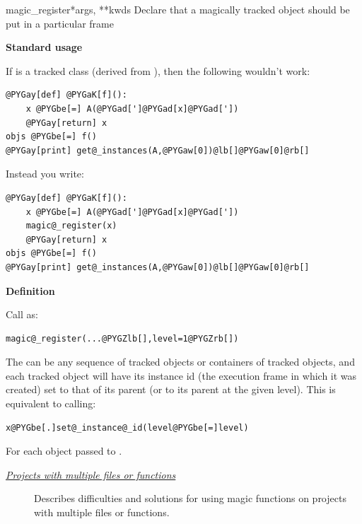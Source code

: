 \documentclass[letterpaper,10pt,english]{manual}
\begin{document}
\hypertarget{brian.magic_register}{}\begin{funcdesc}{magic\_register}{*args, **kwds}
Declare that a magically tracked object should be put in a particular frame

\textbf{Standard usage}

If  is a tracked class (derived from ), then the following wouldn't
work:

\begin{Verbatim}[commandchars=@\[\]]
@PYGay[def] @PYGaK[f]():
    x @PYGbe[=] A(@PYGad[']@PYGad[x]@PYGad['])
    @PYGay[return] x
objs @PYGbe[=] f()
@PYGay[print] get@_instances(A,@PYGaw[0])@lb[]@PYGaw[0]@rb[]
\end{Verbatim}

Instead you write:

\begin{Verbatim}[commandchars=@\[\]]
@PYGay[def] @PYGaK[f]():
    x @PYGbe[=] A(@PYGad[']@PYGad[x]@PYGad['])
    magic@_register(x)
    @PYGay[return] x    
objs @PYGbe[=] f()
@PYGay[print] get@_instances(A,@PYGaw[0])@lb[]@PYGaw[0]@rb[]
\end{Verbatim}

\textbf{Definition}

Call as:

\begin{Verbatim}[commandchars=@\[\]]
magic@_register(...@PYGZlb[],level=1@PYGZrb[])
\end{Verbatim}

The  can be any sequence of tracked objects or containers of tracked objects,
and each tracked object will have its instance id (the execution frame in which it was
created) set to that of its parent (or to its parent at the given level). This is
equivalent to calling:

\begin{Verbatim}[commandchars=@\[\]]
x@PYGbe[.]set@_instance@_id(level@PYGbe[=]level)
\end{Verbatim}

For each object  passed to \hyperlink{brian.magic_register}{}.
\end{funcdesc}



\begin{description}
\item[\hyperlink{projects-with-multiple-files}{\emph{Projects with multiple files or functions}}]
Describes difficulties and solutions for using magic functions
on projects with multiple files or functions.

\end{description}
\end{document}

